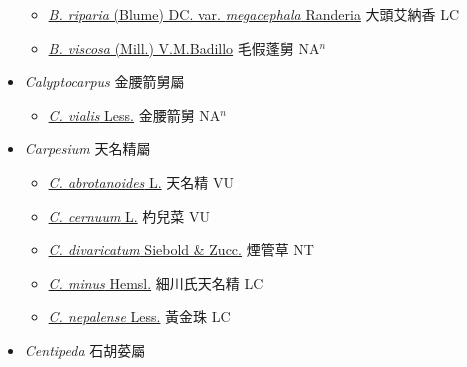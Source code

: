 \begin{itemize}
\begin{itemize}
        \item[] \href{http://www.theplantlist.org/tpl1.1/search?q=Blumea+riparia+var.+megacephala}{\textit{B. riparia} (Blume) DC. var. \textit{megacephala} Randeria}   大頭艾納香 LC
        \item[] \href{http://www.theplantlist.org/tpl1.1/search?q=Blumea+viscosa}{\textit{B. viscosa} (Mill.) V.M.Badillo}   毛假蓬舅 NA$^n$
  \end{itemize}
 \item[] \textit{Calyptocarpus} 金腰箭舅屬
                    
  \begin{itemize}
        \item[] \href{http://www.theplantlist.org/tpl1.1/search?q=Calyptocarpus+vialis}{\textit{C. vialis} Less.}   金腰箭舅 NA$^n$
  \end{itemize}
 \item[] \textit{Carpesium} 天名精屬
                    
  \begin{itemize}
        \item[] \href{http://www.theplantlist.org/tpl1.1/search?q=Carpesium+abrotanoides}{\textit{C. abrotanoides} L.}   天名精 VU
        \item[] \href{http://www.theplantlist.org/tpl1.1/search?q=Carpesium+cernuum}{\textit{C. cernuum} L.}   杓兒菜 VU
        \item[] \href{http://www.theplantlist.org/tpl1.1/search?q=Carpesium+divaricatum}{\textit{C. divaricatum} Siebold \& Zucc.}   煙管草 NT
        \item[] \href{http://www.theplantlist.org/tpl1.1/search?q=Carpesium+minus}{\textit{C. minus} Hemsl.}   細川氏天名精 LC
        \item[] \href{http://www.theplantlist.org/tpl1.1/search?q=Carpesium+nepalense}{\textit{C. nepalense} Less.}   黃金珠 LC
  \end{itemize}
 \item[] \textit{Centipeda} 石胡荽屬
                    

\end{itemize}
